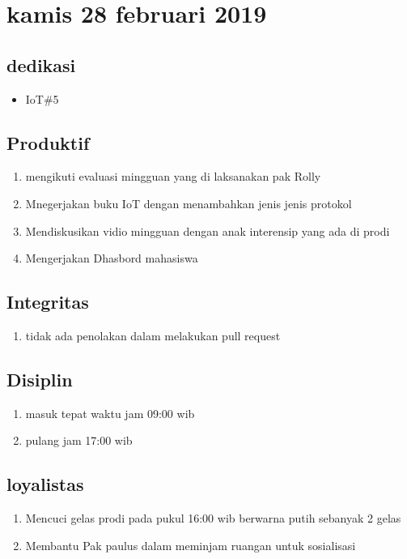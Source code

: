 \section{kamis 28 februari 2019}
\subsection{dedikasi}
\begin{itemize}
  \item IoT\#5
\end{itemize}
\subsection{Produktif}
\begin{enumerate}
  \item mengikuti evaluasi mingguan yang di laksanakan pak Rolly
  \item Mnegerjakan buku IoT dengan menambahkan jenis jenis protokol
  \item Mendiskusikan vidio mingguan dengan anak interensip yang ada di prodi
  \item Mengerjakan Dhasbord mahasiswa
\end{enumerate}
\subsection{Integritas}
\begin{enumerate}
  \item tidak ada penolakan dalam melakukan pull request
\end{enumerate}
\subsection{Disiplin}
\begin{enumerate}
  \item masuk tepat waktu jam 09:00 wib
  \item pulang jam 17:00 wib
\end{enumerate}
\subsection{loyalistas}
\begin{enumerate}
  \item Mencuci gelas prodi pada pukul 16:00 wib berwarna putih sebanyak 2 gelas
  \item Membantu Pak paulus dalam meminjam ruangan untuk sosialisasi
\end{enumerate} 